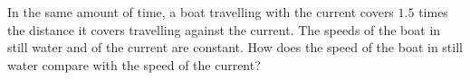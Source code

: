 In the same amount of time, a boat travelling with the current covers $1.5$ times the distance it covers travelling against the current. The speeds of the boat in still water and of the current are constant. How does the speed of the boat in still water compare with the speed of the current?
